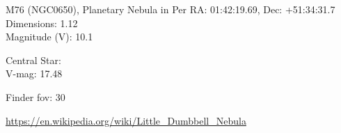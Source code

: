\begin{block}{M76 (NGC0650), Planetary Nebula in Per}
    RA: 01:42:19.69, Dec: +51:34:31.7 \\ 
    Dimensions: 1.12 \\ 
    Magnitude (V): 10.1


    Central Star: \\ 
      \hspace{1em}V-mag: 17.48 


    Finder fov: 30 

    \url{https://en.wikipedia.org/wiki/Little_Dumbbell_Nebula} 
\end{block}